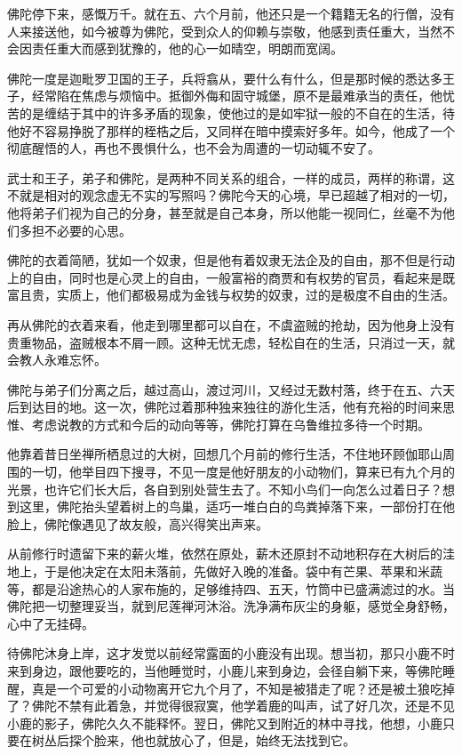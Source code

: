 \documentclass[twoside,openany]{book}
\begin{document}
佛陀停下来，感慨万千。就在五、六个月前，他还只是一个籍籍无名的行僧，没有人来接送他，如今被尊为佛陀，受到众人的仰赖与崇敬，他感到责任重大，当然不会因责任重大而感到犹豫的，他的心一如晴空，明朗而宽阔。

佛陀一度是迦毗罗卫国的王子，兵将翕从，要什么有什么，但是那时候的悉达多王子，经常陷在焦虑与烦恼中。抵御外侮和固守城堡，原不是最难承当的责任，他忧苦的是缠结于其中的许多矛盾的现象，使他过的是如牢狱一般的不自在的生活，待他好不容易挣脱了那样的桎梏之后，又同样在暗中摸索好多年。如今，他成了一个彻底醒悟的人，再也不畏惧什么，也不会为周遭的一切动辄不安了。

武士和王子，弟子和佛陀，是两种不同关系的组合，一样的成员，两样的称谓，这不就是相对的观念虚无不实的写照吗？佛陀今天的心境，早已超越了相对的一切，他将弟子们视为自己的分身，甚至就是自己本身，所以他能一视同仁，丝毫不为他们多担不必要的心思。

佛陀的衣着简陋，犹如一个奴隶，但是他有着奴隶无法企及的自由，那不但是行动上的自由，同时也是心灵上的自由，一般富裕的商贾和有权势的官员，看起来是既富且贵，实质上，他们都极易成为金钱与权势的奴隶，过的是极度不自由的生活。

再从佛陀的衣着来看，他走到哪里都可以自在，不虞盗贼的抢劫，因为他身上没有贵重物品，盗贼根本不屑一顾。这种无忧无虑，轻松自在的生活，只消过一天，就会教人永难忘怀。

佛陀与弟子们分离之后，越过高山，渡过河川，又经过无数村落，终于在五、六天后到达目的地。这一次，佛陀过着那种独来独往的游化生活，他有充裕的时间来思惟、考虑说教的方式和今后的动向等等，佛陀打算在乌鲁维拉多待一个时期。

他靠着昔日坐禅所栖息过的大树，回想几个月前的修行生活，不住地环顾伽耶山周围的一切，他举目四下搜寻，不见一度是他好朋友的小动物们，算来已有九个月的光景，也许它们长大后，各自到别处营生去了。不知小鸟们一向怎么过着日子？想到这里，佛陀抬头望着树上的鸟巢，适巧一堆白白的鸟粪掉落下来，一部份打在他脸上，佛陀像遇见了故友般，高兴得笑出声来。

从前修行时遗留下来的薪火堆，依然在原处，薪木还原封不动地积存在大树后的洼地上，于是他决定在太阳未落前，先做好入晚的准备。袋中有芒果、苹果和米蔬等，都是沿途热心的人家布施的，足够维持四、五天，竹筒中已盛满滤过的水。当佛陀把一切整理妥当，就到尼莲禅河沐浴。洗净满布灰尘的身躯，感觉全身舒畅，心中了无挂碍。

待佛陀沐身上岸，这才发觉以前经常露面的小鹿没有出现。想当初，那只小鹿不时来到身边，跟他要吃的，当他睡觉时，小鹿儿来到身边，会径自躺下来，等佛陀睡醒，真是一个可爱的小动物离开它九个月了，不知是被猎走了呢？还是被土狼吃掉了？佛陀不禁有此着急，并觉得很寂寞，他学着鹿的叫声，试了好几次，还是不见小鹿的影子，佛陀久久不能释怀。翌日，佛陀又到附近的林中寻找，他想，小鹿只要在树丛后探个脸来，他也就放心了，但是，始终无法找到它。
\end{document}

